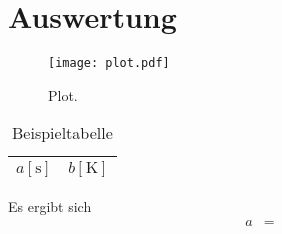 \section{Auswertung}
\label{sec:Auswertung}

\begin{figure}
  \centering
  \texttt{[image: plot.pdf]}
  \caption{Plot.}
  \label{fig:plot}
\end{figure}

\begin{table}
  \centering
  \caption{Beispieltabelle}
  \label{tab:tabelle_beispiel}
  \begin{tabular}{c c}
    \toprule
    {$a [\si{\second}]$} & {$b [\si{\kelvin}]$}\\
    \midrule
    
    \bottomrule
  \end{tabular}
\end{table}

Es ergibt sich
\begin{align}
  a &=  \\
\end{align}
